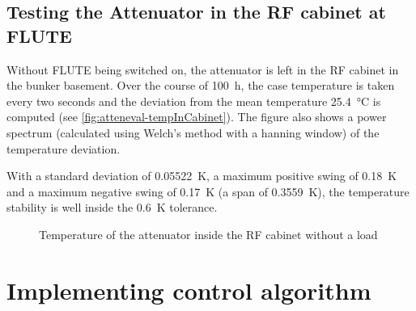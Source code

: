 \FloatBarrier
\subsection{Testing the Attenuator in the RF cabinet at FLUTE}
Without FLUTE being switched on, the attenuator is left in the RF cabinet in the bunker basement. Over the course of \SI{100}{\hour}, the case temperature is taken every two seconds and the deviation from the mean temperature \SI{25.4}{\degreeCelsius} is computed (see \autoref{fig:atteneval-tempInCabinet}). The figure also shows a power spectrum (calculated using Welch's method with a hanning window) of the temperature deviation.

With a standard deviation of \SI{0.05522}{\kelvin}, a maximum positive swing of \SI{0.18}{\kelvin} and a maximum negative swing of \SI{0.17}{\kelvin} (a span of \SI{0.3559}{\kelvin}), the temperature stability is well inside the \SI{0.6}{\kelvin} tolerance.

\begin{figure}[tb]
		\hfill
        \subfloat[Time]{}
        
        \hfill
       \caption{Temperature of the attenuator inside the RF cabinet without a load}
    \label{fig:atteneval-tempInCabinet}
\end{figure}








\FloatBarrier
\newpage
\newpage
\section{Implementing control algorithm}